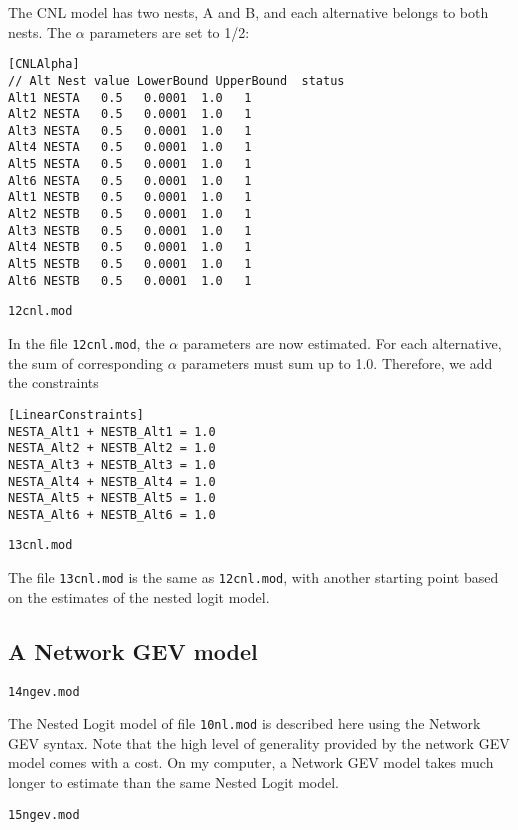 \documentclass[12pt]{memoir}
\begin{document}
The CNL model has two nests, A and B, and each alternative  belongs to both nests. 
The  $\alpha$ parameters are set to 1/2:
\small 
{\footnotesize
\begin{verbatim}
[CNLAlpha]
// Alt Nest value LowerBound UpperBound  status
Alt1 NESTA   0.5   0.0001  1.0   1
Alt2 NESTA   0.5   0.0001  1.0   1
Alt3 NESTA   0.5   0.0001  1.0   1
Alt4 NESTA   0.5   0.0001  1.0   1
Alt5 NESTA   0.5   0.0001  1.0   1
Alt6 NESTA   0.5   0.0001  1.0   1
Alt1 NESTB   0.5   0.0001  1.0   1
Alt2 NESTB   0.5   0.0001  1.0   1
Alt3 NESTB   0.5   0.0001  1.0   1
Alt4 NESTB   0.5   0.0001  1.0   1
Alt5 NESTB   0.5   0.0001  1.0   1
Alt6 NESTB   0.5   0.0001  1.0   1
\end{verbatim}
}
\normalsize

\begin{flushright}
\verb+12cnl.mod+
\end{flushright}
In the file \verb+12cnl.mod+, the $\alpha$ parameters are now
estimated. For each alternative, the sum of corresponding $\alpha$
parameters must sum up to 1.0. Therefore, we add the constraints
{\footnotesize
\begin{verbatim}
[LinearConstraints]
NESTA_Alt1 + NESTB_Alt1 = 1.0
NESTA_Alt2 + NESTB_Alt2 = 1.0
NESTA_Alt3 + NESTB_Alt3 = 1.0
NESTA_Alt4 + NESTB_Alt4 = 1.0
NESTA_Alt5 + NESTB_Alt5 = 1.0
NESTA_Alt6 + NESTB_Alt6 = 1.0
\end{verbatim}
}

\begin{flushright}
\verb+13cnl.mod+
\end{flushright}
The file \verb+13cnl.mod+ is the same as \verb+12cnl.mod+, with
another starting point based on the estimates of the nested logit model.

\subsection{A Network GEV model}
\begin{flushright}
\verb+14ngev.mod+
\end{flushright}
The Nested Logit model of file \verb+10nl.mod+ is described here using
the Network GEV syntax. Note that the high level of generality
provided by the network GEV model comes with a cost. On my computer, a
Network GEV model takes much longer to estimate than the same
Nested Logit model. 

\begin{flushright}
\verb+15ngev.mod+
\end{flushright}
\end{document}
